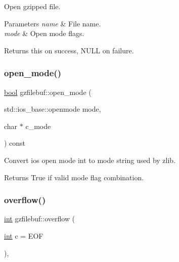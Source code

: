 Open gzipped file. 


\begin{DoxyParams}{Parameters}
{\em name} & File name. \\
\hline
{\em mode} & Open mode flags. \\
\hline
\end{DoxyParams}
\begin{DoxyReturn}{Returns}
{\ttfamily this} on success, N\+U\+LL on failure. 
\end{DoxyReturn}
\mbox{\label{classgzfilebuf_ab0c2c304183e591706681af26add3da2}} 
\subsubsection{\texorpdfstring{open\+\_\+mode()}{open\_mode()}}
{\footnotesize\ttfamily \mbox{\hyperlink{libretro_8h_a4a26dcae73fb7e1528214a068aca317e}{bool}} gzfilebuf\+::open\+\_\+mode (\begin{DoxyParamCaption}\item[{std\+::ios\+\_\+base\+::openmode}]{mode,  }\item[{char $\ast$}]{c\+\_\+mode }\end{DoxyParamCaption}) const\hspace{0.3cm}{\ttfamily [protected]}}



Convert ios open mode int to mode string used by zlib. 

\begin{DoxyReturn}{Returns}
True if valid mode flag combination. 
\end{DoxyReturn}
\mbox{\label{classgzfilebuf_a7a10ee573ebe6777c8a64e316569f694}} 
\subsubsection{\texorpdfstring{overflow()}{overflow()}\hspace{0.1cm}{\footnotesize\ttfamily [1/2]}}
{\footnotesize\ttfamily \mbox{\hyperlink{ioapi_8h_a787fa3cf048117ba7123753c1e74fcd6}{int}} gzfilebuf\+::overflow (\begin{DoxyParamCaption}\item[{\mbox{\hyperlink{ioapi_8h_a787fa3cf048117ba7123753c1e74fcd6}{int}}}]{c = {\ttfamily EOF} }\end{DoxyParamCaption})\hspace{0.3cm}{\ttfamily [protected]}, {\ttfamily [virtual]}}

